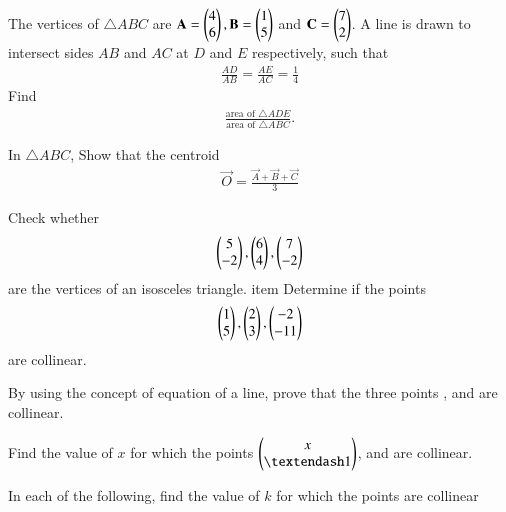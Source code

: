 %
\item The vertices of $\triangle ABC$ are $\mathbf{A}=\begin{pmatrix}4\\6\end{pmatrix},  \mathbf{B}=\begin{pmatrix}1\\5\end{pmatrix}$ and  $\mathbf{C} =  \begin{pmatrix}7\\2\end{pmatrix}$.  A line is drawn to intersect sides $AB$ and $AC$ at $D$ and $E$ respectively, such that
\begin{align}
\frac{AD}{AB}=\frac{AE}{AC}= \frac{1}{4}
\end{align}
%
Find 
\begin{align}
\frac{\text{area of }\triangle ADE}{\text{area of }\triangle ABC}.
\end{align}
\solution


\item In $\triangle ABC$, Show that the centroid 
\begin{align}
\vec{O} = \frac{\vec{A}+\vec{B}+\vec{C}}{3}
\end{align}
\item Check whether 
\begin{align}
\begin{pmatrix}5\\-2\end{pmatrix}, \begin{pmatrix}6\\4\end{pmatrix}, \begin{pmatrix}7\\-2\end{pmatrix}
\end{align}
are the vertices of an isosceles triangle.
%
 item Determine if the points 
\begin{align}
\begin{pmatrix}1\\5\end{pmatrix}, \begin{pmatrix}2\\3\end{pmatrix}, \begin{pmatrix}-2\\-11\end{pmatrix}
\end{align}
%
are collinear.	
\item By using the concept of equation of a line, prove that the three points ,  and  are collinear.
\item Find the value of $x$ for which the points $\myvec{x\\ – 1}$,  and  are collinear.
\item  In each of the following, find the value of $k$ for which the points are collinear

